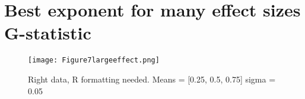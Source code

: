 \section{Best exponent for many effect sizes G-statistic}

\begin{figure}
\centering
\texttt{[image: Figure7largeeffect.png]}
\caption{Right data, R formatting needed. Means = [0.25, 0.5, 0.75] sigma = 0.05}
\end{figure}